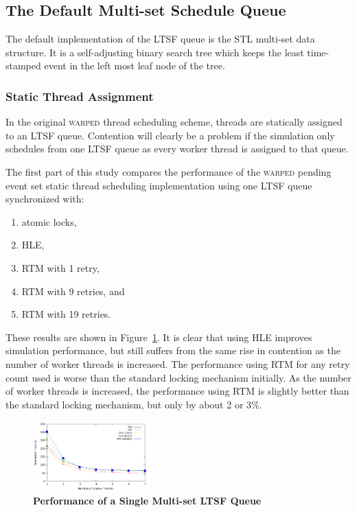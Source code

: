\documentclass{sig-alternate}
\begin{document}
\subsection{The Default Multi-set Schedule Queue}

The default implementation of the LTSF queue is the STL multi-set data structure.  It is a
self-adjusting binary search tree which keeps the least time-stamped event in the left
most leaf node of the tree.

\subsubsection{Static Thread Assignment}

In the original \textsc{warped} thread scheduling scheme, threads are statically assigned
to an LTSF queue.  Contention will clearly be a problem if the simulation only schedules
from one LTSF queue as every worker thread is assigned to that queue.

The first part of this study compares the performance of the \textsc{warped} pending event
set static thread scheduling implementation using one LTSF queue synchronized with: 

\begin{enumerate}
  \setlength{\itemsep}{-0.05in}
  \item atomic locks, 
  \item HLE, 
  \item RTM with 1 retry, 
  \item RTM with 9 retries, and 
  \item RTM with 19 retries.  
\end{enumerate}

\noindent
These results are shown in Figure~\ref{fig:noThrMig_timeVSthreads_1schq}.  It is clear
that using HLE improves simulation performance, but still suffers from the same rise in
contention as the number of worker threads is increased.  The performance using RTM for
any retry count used is worse than the standard locking mechanism initially.  As the
number of worker threads is increased, the performance using RTM is slightly better than
the standard locking mechanism, but only by about 2 or 3\%.

\begin{figure}
    \centering
    \graphicspath{ {./figures/} }
    \includegraphics[width=0.4\textwidth,keepaspectratio]{hugeepidemicsim-NOmig-timeVSthreads-multiset-1schQ}
    \caption{\textbf{Performance of a Single Multi-set LTSF Queue}}
    \label{fig:noThrMig_timeVSthreads_1schq}
\end{figure}
\end{document}
